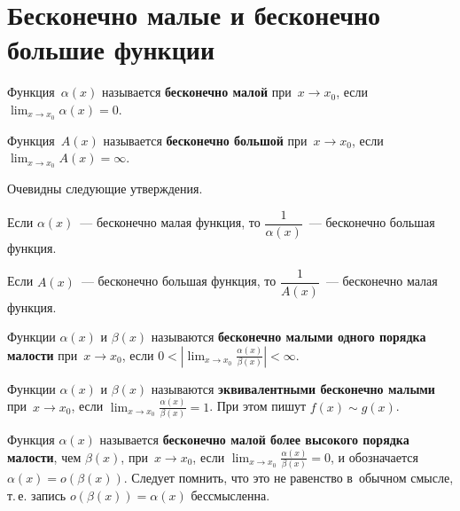 \section{Бесконечно малые и бесконечно большие функции}
 Функция~$\alpha(x)$ называется \textbf{бесконечно малой} при~$x \to x_0$, если $\displaystyle \lim_{x \to x_0} \alpha(x) = 0$.

 Функция~$A(x)$ называется \textbf{бесконечно большой} при~$x \to x_0$, если $\displaystyle \lim_{x \to x_0} A(x) = \infty$.

Очевидны следующие утверждения.
\begin{statement}
Если $\alpha(x)$~--- бесконечно малая функция, то $\dfrac1{\alpha(x)}$~--- бесконечно большая функция.
\end{statement}

\begin{statement}
Если $A(x)$~--- бесконечно большая функция, то $\dfrac1{A(x)}$~--- бесконечно малая функция.
\end{statement}

Функции $\alpha(x)$ и $\beta(x)$ называются \textbf{бесконечно малыми одного порядка малости} при~$x \to x_0$, если
$\displaystyle 0 < \left| \lim_{x \to x_0} \frac{\alpha(x)}{\beta(x)} \right| < \infty$.

Функции $\alpha(x)$ и $\beta(x)$ называются \textbf{эквивалентными бесконечно малыми} при~$x \to x_0$, если
$\displaystyle \lim_{x \to x_0} \frac{\alpha(x)}{\beta(x)} = 1$.
При этом пишут $f(x) \sim g(x)$.

Функция $\alpha(x)$ называется \textbf{бесконечно малой более высокого порядка малости}, чем $\beta(x)$, при~$x \to x_0$, если
$\displaystyle \lim_{x \to x_0} \frac{\alpha(x)}{\beta(x)} = 0$, и обозначается $\alpha(x) = o(\beta(x))$.
Следует помнить, что это не равенство в~обычном смысле, т.\,е. запись $o(\beta(x)) = \alpha(x)$ бессмысленна.